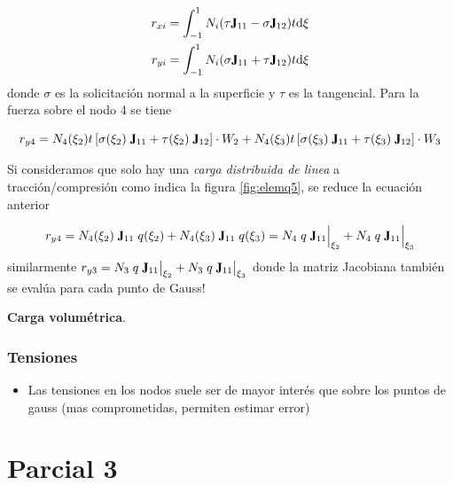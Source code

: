 \documentclass[draft,11pt, a4paper,titlepage]{article}
\newcommand{\rmfontbf}[1]{{\fontfamily{ptm}\selectfont%
\textbf{#1}}}
\newcommand{\di}{\textrm{d}}
\newcommand{\jac}{\rmfontbf{J}}
\begin{document}
\begin{align}
    r_{xi}&=\int^1_{-1}N_i (\tau \jac_{11}- \sigma \jac_{12})t\di \xi \\
    r_{yi}&=\int^1_{-1}N_i (\sigma \jac_{11}+\tau \jac_{12})t \di \xi 
\end{align}
    donde $\sigma$ es la solicitación normal a la superficie y $\tau$ es la tangencial. Para la fuerza sobre el nodo 4 se tiene
    
    $$r_{y4}= N_4(\xi_2)t\left[\sigma(\xi_2)\; \jac_{11}+\tau(\xi_2)\; \jac_{12}\right] \cdot W_2 + N_4(\xi_3)t\left[\sigma(\xi_3)\; \jac_{11}+\tau(\xi_3)\; \jac_{12}\right]\cdot W_3 $$

    Si consideramos que solo hay una \emph{carga distribuida de linea} a tracción/compresión como indica la figura \ref{fig:elemq5}, se reduce la ecuación anterior
    
    $$ r_{y4} = N_4(\xi_2)\;\jac_{11}\;q(\xi_2) + N_4(\xi_3)\;\jac_{11}\;q(\xi_3) =N_4\;q \;\jac_{11}\Big|_{\xi_2} + N_4\;q\; \jac_{11}\Big|_{\xi_3} $$
    similarmente $r_{y3} = N_3\;q \;\jac_{11}\big|_{\xi_2} + N_3\;q\; \jac_{11}\big|_{\xi_3} $ donde la matriz Jacobiana también se evalúa para cada punto de Gauss!
    
    \textbf{Carga volumétrica}. 
\subsubsection*{Tensiones}
    \begin{itemize}
        \item Las tensiones en los nodos suele ser de mayor interés que sobre los puntos de gauss (mas comprometidas, permiten estimar error)
    \end{itemize}
    \clearpage
% 
\section{Parcial 3}
\end{document}
